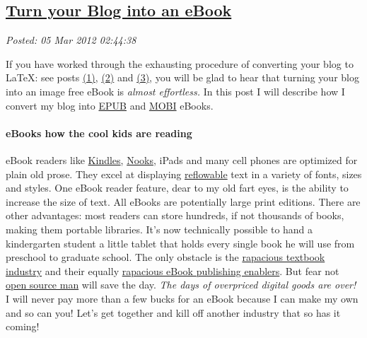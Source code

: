 %

\subsection*{\href{http://bakerjd99.wordpress.com/2012/03/04/turn-your-blog-into-an-ebook/}{Turn your Blog into an eBook}}


\noindent\emph{Posted: 05 Mar 2012 02:44:38}
\vspace{6pt}

If you have worked through the exhausting procedure of converting your
blog to \LaTeX: see posts
\href{http://bakerjd99.wordpress.com/2012/02/11/wordpress-to-latex-with-pandoc-and-j-prerequisites-part-1/}{(1)},
\href{http://bakerjd99.wordpress.com/2012/02/18/wordpress-to-latex-with-pandoc-and-j-latex-directories-part-2-2/}{(2)}
and
\href{http://bakerjd99.wordpress.com/2012/02/25/wordpress-to-latex-with-pandoc-and-j-using-texfrwpxml-ijs-part-3/}{(3)},
you will be glad to hear that turning your blog into an image free eBook
is \emph{almost effortless.} In this post I will describe how I convert
my blog into \href{http://www.web-books.com/Publishing/epub.htm}{EPUB}
and \href{http://wiki.mobileread.com/wiki/MOBI}{MOBI} eBooks.

\paragraph{eBooks how the cool kids are reading}

eBook readers like
\href{http://www.amazon.com/gp/feature.html?ie=UTF8\&docId=1000750701\&tag=googhydr-20\&hvadid=9562889797\&ref=pd\_sl\_1hhrk6zi46\_e}{Kindles},
\href{http://www.barnesandnoble.com/u/nook/379003208?r=1\&utm\_source=google\&cm\_mmc=Google-\_-NOOK\%20General-\_-NOOK\%20(exact)-\_-Nook\&cm\_mmca1=1d6c97e6-5d23-2769-73f9-00005e04715e\&utm\_medium=cpc\&utm\_term=no}{Nooks},
iPads and many cell phones are optimized for plain old prose. They excel
at displaying
\href{http://www.pcmag.com/encyclopedia\_term/0,2542,t=reflowable+text\&i=58163,00.asp}{reflowable}
text in a variety of fonts, sizes and styles. One eBook reader feature,
dear to my old fart eyes, is the ability to increase the size of text.
All eBooks are potentially large print editions. There are other
advantages: most readers can store hundreds, if not thousands of books,
making them portable libraries. It's now technically possible to hand a
kindergarten student a little tablet that holds every single book he
will use from preschool to graduate school. The only obstacle is the
\href{http://funny-about-money.com/2010/07/20/textbook-ripoffs-why-college-leaves-kids-in-debt/}{rapacious
textbook industry} and their equally
\href{http://www.zdnet.com/blog/mobile-news/why-the-apple-textbook-program-will-never-work/6526}{rapacious
eBook publishing enablers}. But fear not
\href{http://www.techradar.com/news/software/why-is-open-source-dominated-by-men--1047390}{open
source man} will save the day. \emph{The days of overpriced digital
goods are over!} I will never pay more than a few bucks for an eBook
because I can make my own and so can you! Let's get together and kill
off another industry that so has it coming!

